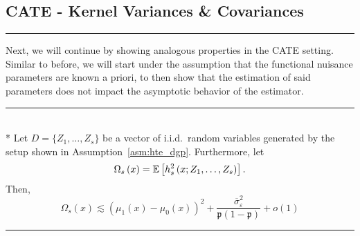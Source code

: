 \subsection{CATE - Kernel Variances \& Covariances}
\hrule
Next, we will continue by showing analogous properties in the CATE setting.
Similar to before, we will start under the assumption that the functional nuisance parameters are known a priori, to then show that the estimation of said parameters does not impact the asymptotic behavior of the estimator.
\vspace{0.5cm}
\hrule

\begin{lem}\label{lem:CATE_omega_s}\mbox{}\\*
	Let $D = \{Z_1, \dotsc, Z_{s}\}$ be a vector of i.i.d.\ random variables generated by the setup shown in Assumption~\ref{asm:hte_dgp}.
	Furthermore, let
	\begin{equation}
		\Omega_{s}\left(x\right)
		= \mathbb{E}\left[h_{s}^{2}\left(x; Z_1, \ldots,  Z_{s}\right)\right].
	\end{equation}
	Then,
	\begin{equation}
		\Omega_{s}\left(x\right)
		\lesssim \left(\mu_{1}\left(x\right) - \mu_{0}\left(x\right)\right)^2 + \frac{\overline{\sigma}^2_{\varepsilon}}{\mathfrak{p}\left(1 - \mathfrak{p}\right)} + o(1)
	\end{equation}
\end{lem}
\hrule
